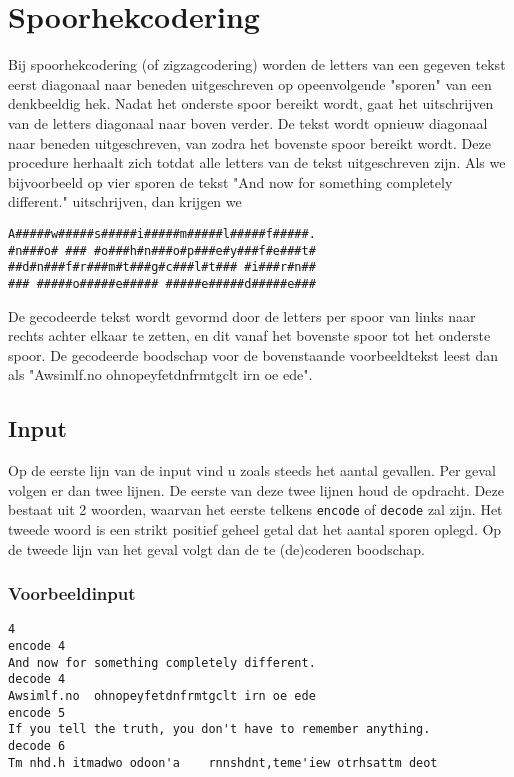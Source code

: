 
\section*{Spoorhekcodering}

Bij spoorhekcodering (of zigzagcodering) worden de letters van een gegeven tekst
eerst diagonaal naar beneden uitgeschreven op opeenvolgende "sporen" van een
denkbeeldig hek. Nadat het onderste spoor bereikt wordt, gaat het uitschrijven
van de letters diagonaal naar boven verder. De tekst wordt opnieuw diagonaal
naar beneden uitgeschreven, van zodra het bovenste spoor bereikt wordt. Deze
procedure herhaalt zich totdat alle letters van de tekst uitgeschreven zijn. Als
we bijvoorbeeld op vier sporen de tekst "And now for something completely
different." uitschrijven, dan krijgen we

\begin{verbatim}
A#####w#####s#####i#####m#####l#####f#####.
#n###o# ### #o###h#n###o#p###e#y###f#e###t#
##d#n###f#r###m#t###g#c###l#t### #i###r#n##
### #####o#####e##### #####e#####d#####e###
\end{verbatim}

De gecodeerde tekst wordt gevormd door de letters per spoor van links naar
rechts achter elkaar te zetten, en dit vanaf het bovenste spoor tot het onderste
spoor. De gecodeerde boodschap voor de bovenstaande voorbeeldtekst leest dan als
"Awsimlf.no  ohnopeyfetdnfrmtgclt irn oe ede".

\subsection*{Input}

Op de eerste lijn van de input vind u zoals steeds het aantal gevallen. Per
geval volgen er dan twee lijnen. De eerste van deze twee lijnen houd de
opdracht. Deze bestaat uit 2 woorden, waarvan het eerste telkens \texttt{encode}
of \texttt{decode} zal zijn. Het tweede woord is een strikt positief geheel
getal dat het aantal sporen oplegd. Op de tweede lijn van het geval volgt dan de
te (de)coderen boodschap.

\subsubsection*{Voorbeeldinput}

\begin{verbatim}
4
encode 4
And now for something completely different.
decode 4
Awsimlf.no  ohnopeyfetdnfrmtgclt irn oe ede
encode 5
If you tell the truth, you don't have to remember anything.
decode 6
Tm nhd.h itmadwo odoon'a    rnnshdnt,teme'iew otrhsattm deot 
\end{verbatim}

